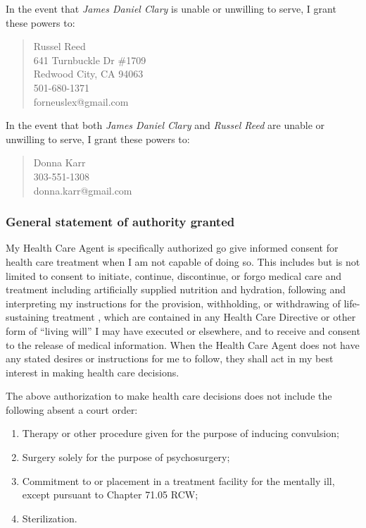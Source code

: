 \documentclass[oneside]{memoir}
\begin{document}
In the event that \emph{James Daniel Clary} is unable or unwilling to serve, I grant these powers to:

\begin{quote}
    Russel Reed\\
    641 Turnbuckle Dr \#1709\\
    Redwood City, CA 94063\\
    501-680-1371\\
    forneuslex@gmail.com
\end{quote}

In the event that both \emph{James Daniel Clary} and \emph{Russel Reed} are unable or unwilling to serve, I grant these powers to:

\begin{quote}
    Donna Karr\\
    303-551-1308\\
    donna.karr@gmail.com
\end{quote}

\subsubsection{General statement of authority granted}\label{general-statement-of-authority-granted}

My Health Care Agent is specifically authorized go give informed consent for health care treatment when I am not capable of doing so. This includes but is not limited to consent to initiate, continue, discontinue, or forgo medical care and treatment including artificially supplied nutrition and hydration, following and interpreting my instructions for the provision, withholding, or withdrawing of life-sustaining treatment , which are contained in any Health Care Directive or other form of ``living will'' I may have executed or elsewhere, and to receive and consent to the release of medical information. When the Health Care Agent does not have any stated desires or instructions for me to follow, they shall act in my best interest in making health care decisions.

The above authorization to make health care decisions does not include the following absent a court order:

\begin{enumerate}
\def\labelenumi{\arabic{enumi}.}
\tightlist
\item
  Therapy or other procedure given for the purpose of inducing convulsion;
\item
  Surgery solely for the purpose of psychosurgery;
\item
  Commitment to or placement in a treatment facility for the mentally ill, except pursuant to Chapter 71.05 RCW;
\item
  Sterilization.
\end{enumerate}
\end{document}
